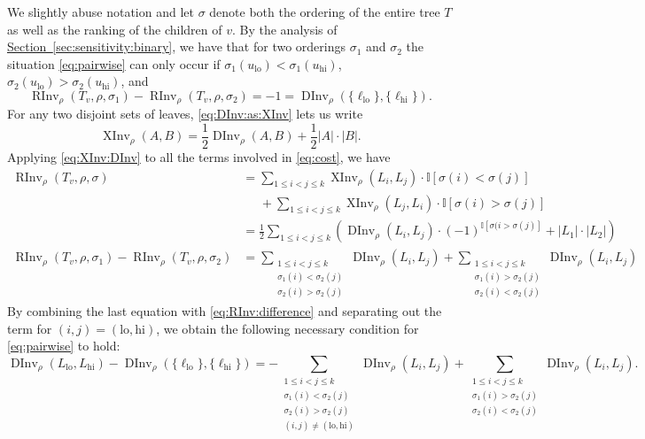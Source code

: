 \documentclass[11pt]{article}
\numberwithin{equation}{section}
\theoremstyle{definition}
\theoremstyle{plain}
\newcommand{\expref}[2]{\hyperref[#2]{#1~\ref{#2}}}
\newcommand{\Indicator}{\mathbb{I}}
\newcommand{\ranking}{\rho}
\newcommand{\ordering}{\sigma}
\DeclareMathOperator{\XInv}{XInv}
\DeclareMathOperator{\DInv}{DInv}
\DeclareMathOperator{\RInv}{RInv}
\newcommand{\lo}{\mathrm{lo}}
\newcommand{\hi}{\mathrm{hi}}
\begin{document}
We slightly abuse notation and  let $\ordering$ denote both the ordering of the entire tree $T$ as well as the ranking of the children of $v$. By the analysis of \expref{Section}{sec:sensitivity:binary}, we have that for two orderings $\ordering_1$ and $\ordering_2$ the situation \eqref{eq:pairwise} can only occur if $\ordering_1(u_\lo) < \ordering_1(u_\hi)$, $\ordering_2(u_\lo) > \ordering_2(u_\hi)$, and 
\begin{equation}\label{eq:RInv:difference}
\RInv_\ranking(T_v,\ranking,\ordering_1) -
\RInv_\ranking(T_v,\ranking,\ordering_2) = -1 = \DInv_\ranking(\{\ell_\lo\},\{\ell_\hi\}).
\end{equation}
For any two disjoint sets of leaves, \eqref{eq:DInv:as:XInv} lets us write 
\begin{equation}\label{eq:XInv:DInv}
\XInv_\ranking(A,B) =  \frac{1}{2} \DInv_\ranking(A,B) + \frac{1}{2} |A| \cdot |B|.
\end{equation}
Applying \eqref{eq:XInv:DInv} to all the terms involved in \eqref{eq:cost}, we have
\begin{align*}
\RInv_\ranking(T_v,\ranking,\ordering) 
& = \sum_{1 \le i < j \le k} \XInv_\ranking(L_i,L_j) \cdot \Indicator[\ordering(i) < \ordering(j)] \\
& \;\;\;\;\; + \sum_{1 \le i < j \le k} \XInv_\ranking(L_j,L_i) \cdot \Indicator[\ordering(i) > \ordering(j)] \\
& = \frac{1}{2} \sum_{1 \le i < j \le k} \left( \DInv_\ranking(L_i,L_j) \cdot (-1)^{\Indicator[\sigma(i > \sigma(j)]} + |L_1| \cdot |L_2| \right) \\
\RInv_\ranking(T_v,\ranking,\ordering_1) -
\RInv_\ranking(T_v,\ranking,\ordering_2)
& = 
\sum\limits_{\substack{1 \le i < j \le k \\ \ordering_1(i) < \ordering_2(j) \\ \ordering_2(i) > \ordering_2(j)}}\DInv_\ranking(L_i,L_j)
+ \sum\limits_{\substack{1 \le i < j \le k \\ \ordering_1(i) > \ordering_2(j) \\ \ordering_2(i) < \ordering_2(j)}} \DInv_\ranking(L_i,L_j)
\end{align*}
By combining the last equation with \eqref{eq:RInv:difference} and separating out the term for $(i,j)=(\lo,\hi)$, we obtain the following necessary condition for \eqref{eq:pairwise} to hold:
\begin{equation}\label{eq:necessary}
\DInv_\ranking(L_\lo,L_\hi) - \DInv_\ranking(\{\ell_\lo\},\{\ell_\hi\})
= -\sum\limits_{\substack{1 \le i < j \le k \\ \ordering_1(i) < \ordering_2(j) \\ \ordering_2(i) > \ordering_2(j) \\ (i,j) \ne (\lo,\hi)}} \DInv_\ranking(L_i,L_j)
+ \sum\limits_{\substack{1 \le i < j \le k \\ \ordering_1(i) > \ordering_2(j) \\ \ordering_2(i) < \ordering_2(j)}} \DInv_\ranking(L_i,L_j).
\end{equation} 
\end{document}
